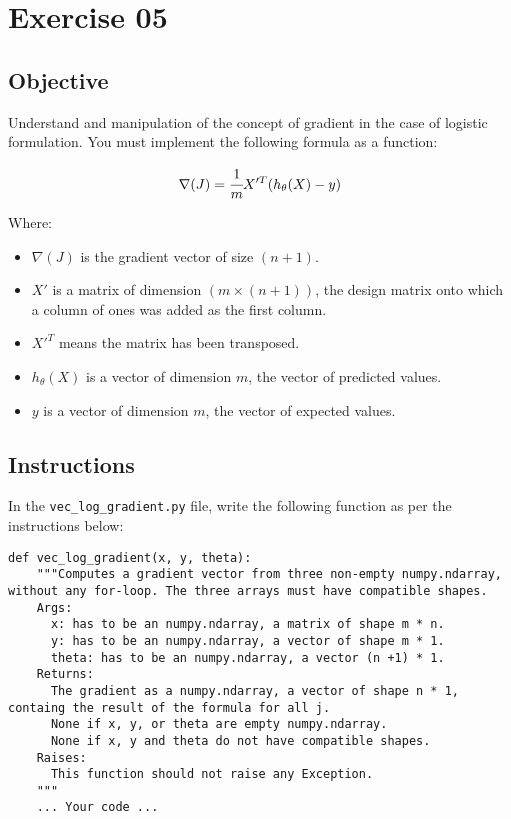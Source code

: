 \chapter{Exercise 05}

\newpage
{}
\makeheaderfilesforbidden

\section*{Objective}
Understand and manipulation of the concept of gradient in the case of logistic formulation.
You must implement the following formula as a function:


$$
\nabla(J) = \cfrac{1}{m} X'^T(h_\theta(X) - y)
$$  

Where:  
\begin{itemize}
  \item $\nabla(J)$ is the gradient vector of size $(n + 1)$.
  \item $X'$ is a matrix of dimension $(m \times (n + 1))$, the design matrix onto which a column of ones was added as the first column.
  \item $X'^T$ means the matrix has been transposed.
  \item $h_\theta(X)$ is a vector of dimension $m$, the vector of predicted values.
  \item $y$ is a vector of dimension $m$, the vector of expected values.
\end{itemize}


\section*{Instructions}
In the \texttt{vec\_log\_gradient.py} file, write the following function as per the instructions below:

\par

\begin{verbatim}
def vec_log_gradient(x, y, theta):
    """Computes a gradient vector from three non-empty numpy.ndarray, without any for-loop. The three arrays must have compatible shapes.
    Args:
      x: has to be an numpy.ndarray, a matrix of shape m * n.
      y: has to be an numpy.ndarray, a vector of shape m * 1.
      theta: has to be an numpy.ndarray, a vector (n +1) * 1.
    Returns:
      The gradient as a numpy.ndarray, a vector of shape n * 1, containg the result of the formula for all j.
      None if x, y, or theta are empty numpy.ndarray.
      None if x, y and theta do not have compatible shapes.
    Raises:
      This function should not raise any Exception.
    """
    ... Your code ...
\end{verbatim}


